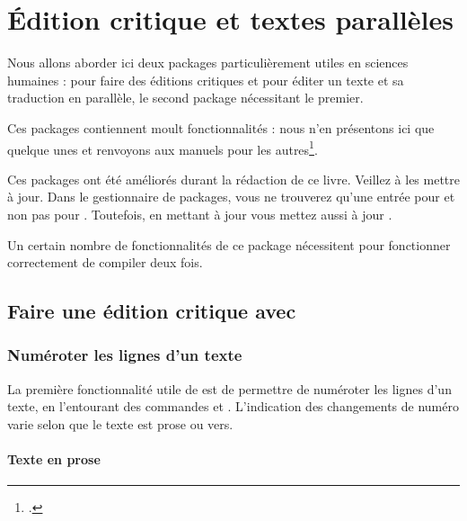 \chapter{Édition critique et textes parallèles}  \label{ledmac}


\begin{prealable}
Nous allons aborder ici deux packages particulièrement utiles en sciences humaines :  pour faire des éditions critiques et  pour éditer un texte et sa traduction en parallèle, le second package nécessitant le premier.

Ces packages contiennent moult fonctionnalités : nous n'en présentons ici que quelque unes et renvoyons aux manuels pour les autres\footcites{ledmac}{ledpar}. 
\end{prealable}

\begin{attention}
Ces packages ont été améliorés durant la rédaction de ce livre. Veillez à les mettre à jour.
Dans le gestionnaire de packages, vous ne trouverez qu'une entrée pour   et non pas pour .  Toutefois, en mettant à jour  vous mettez aussi à jour  .
\end{attention}

\begin{attention}
Un certain nombre de fonctionnalités de ce package nécessitent pour fonctionner correctement de compiler deux fois.
\end{attention}



\section{Faire une édition critique avec }

\subsection{Numéroter les lignes d'un texte}

La première fonctionnalité utile de  est  de permettre  de numéroter les lignes d'un texte, en l'entourant des commandes  et . L'indication des changements de numéro varie selon que le texte est prose ou vers.

\subsubsection{Texte en prose}


